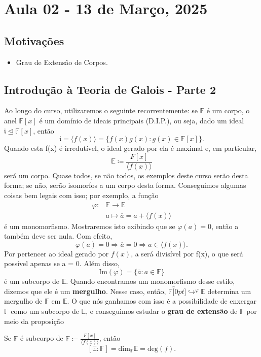 \documentclass[../algebraIII_notes.tex]{subfiles}
\begin{document}
\section{Aula 02 - 13 de Março, 2025}
\subsection{Motivações}
\begin{itemize}
	\item Grau de Extensão de Corpos.
\end{itemize}
\subsection{Introdução à Teoria de Galois - Parte 2}
Ao longo do curso, utilizaremos o seguinte recorrentemente: se \(\mathbb{F}\) é um corpo, o anel \(\mathbb{F}[x]\) é um domínio de ideais principais (D.I.P.), ou seja, dado um ideal \(\mathfrak{i}\trianglelefteq \mathbb{F}[x]\), então
\[
	\mathfrak{i} = \langle f(x) \rangle = \{f(x)g(x): g(x)\in \mathbb{F}[x]\}.
\]
Quando esta f(x) é irredutível, o ideal gerado por ela é maximal e, em particular,
\[
	\mathbb{E} \coloneqq \frac{F[x]}{\langle f(x) \rangle}
\]
será um corpo. Quase todos, se não todos, os exemplos deste curso serão desta forma; se não, serão isomorfos a um corpo desta forma. Conseguimos algumas coisas bem legais com isso; por exemplo, a função
\begin{align*}
	\varphi : & \mathbb{F}\rightarrow \mathbb{E}                 \\
	          & a\mapsto \overline{a} = a + \langle f(x) \rangle
\end{align*}
é um monomorfismo. Mostraremos isto exibindo que se \(\varphi (a) = 0\), então a também deve ser nula. Com efeito,
\[
	\varphi (a) = 0 \Rightarrow \overline{a} = 0 \Rightarrow a\in \langle f(x) \rangle.
\]
Por pertencer ao ideal gerado por \(f(x)\), a será divisível por f(x), o que será possível apenas se a = 0. Além disso,
\[
	\mathrm{Im}(\varphi ) = \{\overline{a}: a \in \mathbb{F}\}
\]
é um subcorpo de \(\mathbb{E}\). Quando encontramos um monomorfismo desse estilo, dizemos que ele é um \textbf{mergulho}. Nesse caso, então, \(\mathbb{F}\overbracket[0pt]{\hookrightarrow}^{\varphi }\mathbb{E}\) determina um mergulho de \(\mathbb{F}\) em \(\mathbb{E}\).
O que nós ganhamos com isso é a possibilidade de enxergar \(\mathbb{F}\) como um subcorpo de \(\mathbb{E}\), e conseguimos estudar o \textbf{grau de extensão} de \(\mathbb{F}\) por meio da proposição
\begin{prop*}
	Se \(\mathbb{F}\) é subcorpo de \(\mathbb{E}\coloneqq \frac{F[x]}{\langle f(x) \rangle}\), então
	\[
		[\mathbb{E}:\mathbb{F}] = \mathrm{dim}_{\mathbb{F}}\mathbb{E} = \mathrm{deg}(f).
	\]
\end{prop*}
\end{document}
